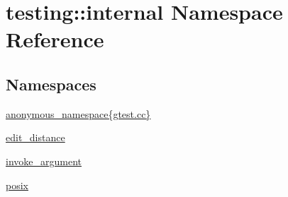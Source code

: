 \hypertarget{namespacetesting_1_1internal}{}\section{testing\+:\+:internal Namespace Reference}
\label{namespacetesting_1_1internal}
\subsection*{Namespaces}
\begin{DoxyCompactItemize}
\item 
 \hyperlink{namespacetesting_1_1internal_1_1anonymous__namespace_02gtest_8cc_03}{anonymous\+\_\+namespace\{gtest.\+cc\}}
\item 
 \hyperlink{namespacetesting_1_1internal_1_1edit__distance}{edit\+\_\+distance}
\item 
 \hyperlink{namespacetesting_1_1internal_1_1invoke__argument}{invoke\+\_\+argument}
\item 
 \hyperlink{namespacetesting_1_1internal_1_1posix}{posix}
\end{DoxyCompactItemize}
